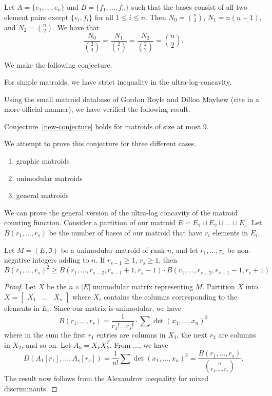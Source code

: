 \documentclass[12pt]{article}
\begin{document}
\begin{example}
	Let $A = \{e_1, \ldots, e_n\}$ and $B = \{f_1, \ldots, f_n\}$ such that the bases consist of all two element pairs except $\{e_i, f_i\}$ for all $1 \leq i \leq n$. Then $N_0 = \binom{n}{2}$, $N_1 = n(n-1)$, and $N_2 = \binom{n}{2}$. We have that 
	\[
		\frac{N_0}{\binom{2}{0}} = \frac{N_1}{\binom{2}{1}} = \frac{N_2}{\binom{2}{2}} = \binom{n}{2}. 
	\]
\end{example}

We make the following conjecture. 

\begin{conj} \label{new-conjecture}
	For simple matroids, we have strict inequality in the ultra-log-concavity. 
\end{conj}

Using the small matroid database of Gordon Royle and Dillon Mayhew (cite in a more official manner), we have verified the following result. 

\begin{thm}
	Conjecture~\ref{new-conjecture} holds for matroids of size at most $9$. 
\end{thm}

We attempt to prove this conjecture for three different cases. 
\begin{enumerate}[label = (\roman*)]
	\item graphic matroids
	\item unimodular matroids
	\item general matroids 
\end{enumerate}

We can prove the general version of the ultra-log concavity of the matroid counting function. Consider a partition of our matroid $E = E_1 \sqcup E_2 \sqcup \ldots \sqcup E_s$. Let $B(r_1, \ldots, r_s)$ be the number of bases of our matroid that have $r_i$ elements in $E_i$. 

\begin{thm}
	Let $M = (E, \mathfrak{I})$ be a unimodular matroid of rank $n$, and let $r_1, \ldots, r_s$ be non-negative integers adding to $n$. If $r_{s-1} \geq 1$, $r_s \geq 1$, then 
	\[
		B(r_1, \ldots, r_s)^2 \geq B(r_1, \ldots, r_{s-2}, r_{s-1} + 1, r_s - 1) \cdot B(r_1, \ldots, r_{s-2}, r_{s-1} - 1, r_{s} + 1)
	\]
\end{thm}

\begin{proof}
	Let $X$ be the $n \times |E|$ unimodular matrix representing $M$. Partition $X$ into $X = \begin{bmatrix} X_1 & \ldots & X_s \end{bmatrix}$ where $X_i$ contains the columns corresponding to the elements in $E_i$. Since our matrix is unimodular, we have 
	\[
		B(r_1, \ldots, r_s) = \frac{1}{r_1! \ldots r_s!} \cdot \sum \det (x_1, \ldots, x_n)^2
	\]
	where in the sum the first $r_1$ entries are columns in $X_1$, the next $r_2$ are columns in $X_2$, and so on. Let $A_k = X_k X_k^T$. From ..., we have 
	\[
		D(A_1 [r_1], \ldots, A_s [r_s]) = \frac{1}{n!} \sum \det (x_1, \ldots, x_n)^2 = \frac{B(r_1, \ldots, r_s)}{\binom{n}{r_1, \ldots, r_s}}. 
	\] 
	The result now follows from the Alexandrov inequality for mixed discriminants. 
\end{proof}
\end{document}
